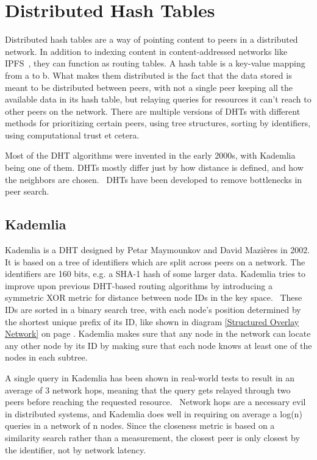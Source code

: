 \section{Distributed Hash Tables}
Distributed hash tables are a way of pointing content to peers in a distributed network. In addition to indexing content in content-addressed networks like IPFS~\cite{Labs_undated-uw}, they can function as routing tables. A hash table is a key-value mapping from a to b. What makes them distributed is the fact that the data stored is meant to be distributed between peers, with not a single peer keeping all the available data in its hash table, but relaying queries for resources it can't reach to other peers on the network. There are multiple versions of DHTs with different methods for prioritizing certain peers, using tree structures, sorting by identifiers, using computational trust et cetera.

Most of the DHT algorithms were invented in the early 2000s, with Kademlia being one of them. DHTs mostly differ just by how distance is defined, and how the neighbors are chosen.~\cite{Cai2015-ra} DHTs have been developed to remove bottlenecks in peer search.

\subsection{Kademlia}
Kademlia is a DHT designed by Petar Maymounkov and David Mazières in 2002. It is based on a tree of identifiers which are split across peers on a network. The identifiers are 160 bits, e.g. a SHA-1 hash of some larger data. Kademlia tries to improve upon previous DHT-based routing algorithms by introducing a symmetric XOR metric for distance between node IDs in the key space.~\cite{Petar_Maymounkov2020-sx} These IDs are sorted in a binary search tree, with each node's position determined by the shortest unique prefix of its ID, like shown in diagram \ref{Structured Overlay Network} on page \pageref{Structured Overlay Network}. Kademlia makes sure that any node in the network can locate any other node by its ID by making sure that each node knows at least one of the nodes in each subtree.

A single query in Kademlia has been shown in real-world tests to result in an average of 3 network hops, meaning that the query gets relayed through two peers before reaching the requested resource.~\cite{Roos2013-mb} Network hops are a necessary evil in distributed systems, and Kademlia does well in requiring on average a log(n) queries in a network of n nodes. Since the closeness metric is based on a similarity search rather than a measurement, the closest peer is only closest by the identifier, not by network latency.~\cite{Eigenmann2020-zm}

